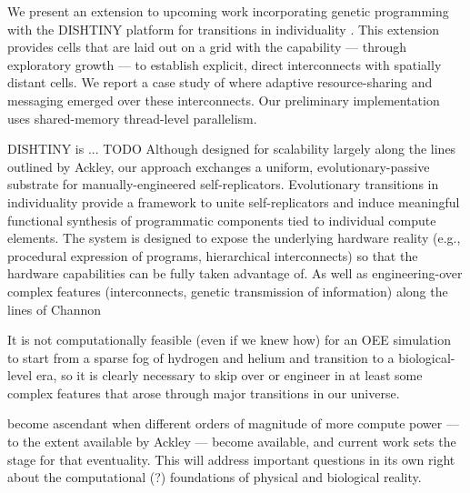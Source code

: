 We present an extension to upcoming work incorporating genetic programming with the DISHTINY platform for transitions in individuality \citep{moreno2019toward}.
This extension provides cells that are laid out on a grid with the capability --- through exploratory growth --- to establish explicit, direct interconnects with spatially distant cells.
We report a case study of where adaptive resource-sharing and messaging emerged over these interconnects.
Our preliminary implementation uses shared-memory thread-level parallelism.

DISHTINY is ... TODO
Although designed for scalability largely along the lines outlined by Ackley, our approach exchanges a uniform, evolutionary-passive substrate for manually-engineered self-replicators.
Evolutionary transitions in individuality provide a framework to unite self-replicators and induce meaningful functional synthesis of programmatic components tied to individual compute elements.
The system is designed to expose the underlying hardware reality (e.g., procedural expression of programs, hierarchical interconnects) so that the hardware capabilities can be fully taken advantage of.
As well as engineering-over complex features (interconnects, genetic transmission of information) along the lines of Channon

\begin{displayquote}
It is not computationally feasible (even if we knew how) for an OEE simulation to start from a sparse fog of hydrogen and helium and transition to a biological-level era, so it is clearly necessary to skip over or engineer in at least some complex features that arose through major transitions in our universe. \citep{channon2019maximum}
\end{displayquote}

become ascendant when different orders of magnitude of more compute power --- to the extent available by Ackley --- become available, and current work sets the stage for that eventuality. \citep{ackley2018alife}
This will address important questions in its own right about the computational (?) foundations of physical and biological reality.
